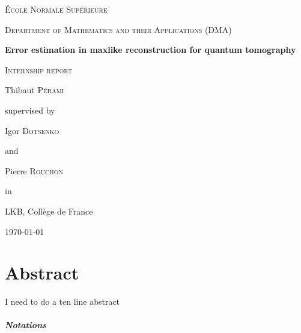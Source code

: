 \documentclass[10pt]{report}
\theoremstyle{plain}
\theoremstyle{definition}
\theoremstyle{remark}
\begin{document}
\begin{titlepage}
  \centering
  {\scshape\huge École Normale Supérieure \par}
  \vspace{0.3cm}
  {\scshape\Large Department of Mathematics and their Applications (DMA) \par}
  \vspace{3cm}
  {\Huge\bfseries Error estimation in maxlike reconstruction for quantum tomography \par}
  \vspace{0.5cm}
  {\scshape\Large Internship report\par}
  \vspace{3cm}
  {\LARGE Thibaut \textsc{Pérami}\par}
  \vfill
  {
    \large
    supervised by\par
    Igor \textsc{Dotsenko}\par
    and\par
    Pierre \textsc{Rouchon}\par
  in\par
  LKB, Collège de France
  }

  \vfill

  {\Large \today\par}
\end{titlepage}

\newcommand{\fset}{\ensuremath{\mathop{\text{\textquotesingle}}}}


\tableofcontents


\chapter*{Abstract}

I need to do a ten line abstract

\vfill

\paragraph{\Huge Notations}

\

\vspace{1.5cm}
\end{document}
